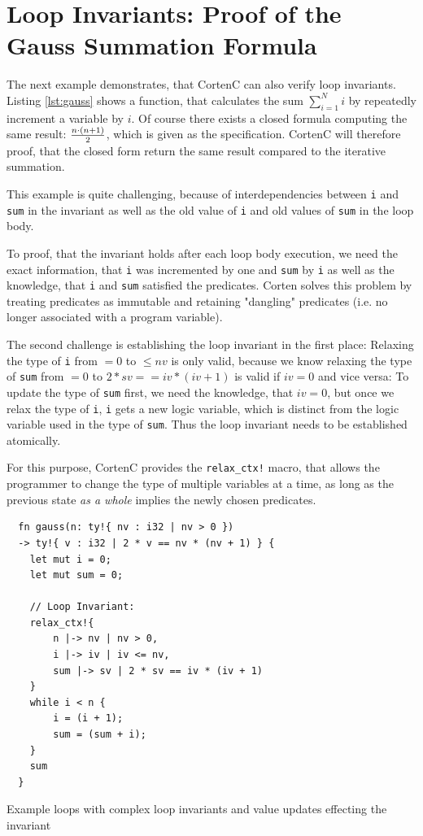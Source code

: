 \documentclass{book}
\newcommand{\code}[1]{\texttt{#1}}
\theoremstyle{definition}
\begin{document}
\section{Loop Invariants: Proof of the Gauss Summation Formula}

The next example demonstrates, that CortenC can also verify loop invariants. Listing \ref{lst:gauss} shows a function, that calculates the sum $\sum_{i = 1}^N i$ by repeatedly increment a variable by $i$. 
Of course there exists a closed formula computing the same result: $n \cdot (n + 1) \over 2$, which is given as the specification. CortenC will therefore proof, that the closed form return the same result compared to the iterative summation.

This example is quite challenging, because of interdependencies between \code{i} and \code{sum} in the invariant as well as the old value of \code{i} and old values of \code{sum} in the loop body. 

To proof, that the invariant holds after each loop body execution, we need the exact information, that \code{i} was incremented by one and \code{sum} by \code{i} as well as the knowledge, that \code{i} and \code{sum} satisfied the predicates. Corten solves this problem by treating predicates as immutable and retaining "dangling" predicates (i.e. no longer associated with a program variable).

The second challenge is establishing the loop invariant in the first place: Relaxing the type of \code{i} from $= 0$ to $\leq nv$ is only valid, because we know relaxing the type of \code{sum} from $= 0$ to $ 2 * sv == iv * (iv + 1)$ is valid if $iv = 0$ and vice versa: To update the type of \code{sum} first, we need the knowledge, that $iv = 0$, but once we relax the type of \code{i}, \code{i} gets a new logic variable, which is distinct from the logic variable used in the type of \code{sum}. Thus the loop invariant needs to be established atomically.

For this purpose, CortenC provides the \code{relax\_ctx!} macro, that allows the programmer to change the type of multiple variables at a time, as long as the previous state \textit{as a whole} implies the newly chosen predicates.

\begin{listing}[h]
  \begin{verbatim}
  fn gauss(n: ty!{ nv : i32 | nv > 0 }) 
  -> ty!{ v : i32 | 2 * v == nv * (nv + 1) } {
    let mut i = 0;
    let mut sum = 0;
    
    // Loop Invariant:
    relax_ctx!{
        n |-> nv | nv > 0,
        i |-> iv | iv <= nv,
        sum |-> sv | 2 * sv == iv * (iv + 1)
    }
    while i < n {
        i = (i + 1);
        sum = (sum + i);
    }
    sum
  }
  \end{verbatim}
  \caption{Example loops with complex loop invariants and value updates effecting the invariant}
  \label{lst:gauss}
\end{listing}
\end{document}
